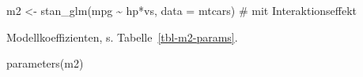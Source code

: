 \documentclass[
  a4paper,
  DIV=11]{scrreprt}
\newenvironment{Shaded}{\begin{snugshade}}{\end{snugshade}}
\newcommand{\AttributeTok}[1]{\textcolor[rgb]{0.40,0.45,0.13}{#1}}
\newcommand{\CommentTok}[1]{\textcolor[rgb]{0.37,0.37,0.37}{#1}}
\newcommand{\FunctionTok}[1]{\textcolor[rgb]{0.28,0.35,0.67}{#1}}
\newcommand{\NormalTok}[1]{\textcolor[rgb]{0.00,0.23,0.31}{#1}}
\newcommand{\OtherTok}[1]{\textcolor[rgb]{0.00,0.23,0.31}{#1}}
\newcommand{\SpecialCharTok}[1]{\textcolor[rgb]{0.37,0.37,0.37}{#1}}
\theoremstyle{definition}
\theoremstyle{remark}
\begin{document}
\begin{Shaded}
\begin{Highlighting}[]
\NormalTok{m2 }\OtherTok{\textless{}{-}} \FunctionTok{stan\_glm}\NormalTok{(mpg }\SpecialCharTok{\textasciitilde{}}\NormalTok{ hp}\SpecialCharTok{*}\NormalTok{vs, }\AttributeTok{data =}\NormalTok{ mtcars)  }\CommentTok{\# mit Interaktionseffekt}
\end{Highlighting}
\end{Shaded}

Modellkoeffizienten, s. Tabelle~\ref{tbl-m2-params}.

\begin{Shaded}
\begin{Highlighting}[]
\FunctionTok{parameters}\NormalTok{(m2)}
\end{Highlighting}
\end{Shaded}
\end{document}
